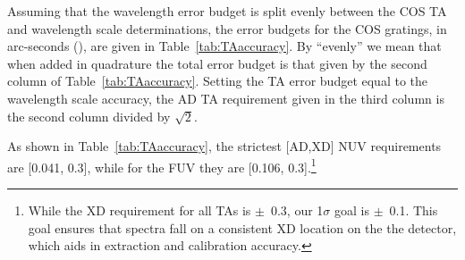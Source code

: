 Assuming that the wavelength error budget is split evenly between the COS TA and wavelength scale determinations,
the error budgets for the COS gratings, in arc-seconds (\arcsec), are given in Table~\ref{tab:TAaccuracy}. By ``evenly'' we mean that when added in quadrature the total error budget is that given by the second column of Table~\ref{tab:TAaccuracy}.
Setting the TA error budget equal to the wavelength scale accuracy, the AD TA requirement given in the third column is the second column divided by $\sqrt{2}$.

As shown in Table~\ref{tab:TAaccuracy}, the strictest [AD,XD] NUV requirements are [0.041, 0.3]\arcsec, while for the FUV they are [0.106, 0.3]\arcsec.\footnote{While the XD requirement for all TAs is $\pm$~0.3\arcsec, our 1$\sigma$ goal is $\pm$~0.1\arcsec. This goal ensures that spectra fall on a consistent XD location on the the detector, which aids in extraction and calibration accuracy.}
